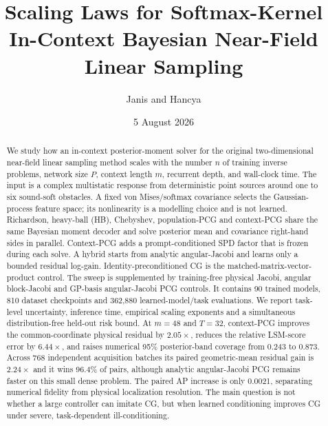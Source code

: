 \documentclass[10pt]{article}
\title{Scaling Laws for Softmax-Kernel In-Context Bayesian Near-Field Linear Sampling}
\author{Janis and Hancya}
\date{5 August 2026}
\begin{document}
\maketitle

\begin{abstract}
We study how an in-context posterior-moment solver for the original
two-dimensional near-field linear sampling method scales with the number $n$ of
training inverse problems, network size $P$, context length $m$, recurrent
depth, and wall-clock time.  The input is a complex multistatic response from
deterministic point sources around one to six sound-soft obstacles.  A fixed
von Mises/softmax covariance selects the Gaussian-process feature space; its
nonlinearity is a modelling choice and is not learned.  Richardson, heavy-ball
(HB), Chebyshev, population-PCG and context-PCG share the same Bayesian moment
decoder and solve posterior mean and covariance right-hand sides in parallel.
Context-PCG adds a prompt-conditioned SPD factor that is frozen during each
solve.  A hybrid starts from analytic angular-Jacobi and learns only a bounded
residual log-gain.  Identity-preconditioned CG is the
matched-matrix-vector-product control.  The sweep
is supplemented by training-free physical Jacobi, angular block-Jacobi and
GP-basis angular-Jacobi PCG controls.  It
contains 90 trained models, 810 dataset
checkpoints and 362,880 learned-model/task evaluations.  We report
task-level uncertainty, inference time,
empirical scaling exponents and a simultaneous distribution-free held-out
risk bound.  At $m=48$ and $T=32$, context-PCG improves the common-coordinate
physical residual by $2.05\times$, reduces the relative LSM-score error by
$6.44\times$, and raises numerical 95\% posterior-band coverage from 0.243 to
0.873.  Across 768 independent acquisition batches its paired geometric-mean
residual gain is $2.24\times$ and it wins 96.4\% of pairs, although analytic
angular-Jacobi PCG remains faster on this small dense problem.  The paired AP
increase is only 0.0021, separating numerical fidelity from physical
localization resolution.  The main
question is not whether a large controller can imitate
CG, but when learned conditioning improves CG under severe, task-dependent
ill-conditioning.
\end{abstract}
\end{document}
